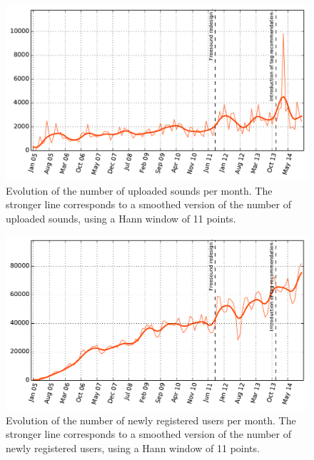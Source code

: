 \begin{figure}
\centerline{\includegraphics[width=1.0\columnwidth]{ch99/pics/Number_of_sounds}}
\caption[Evolution of the number of sounds]{Evolution of the number of uploaded sounds per month. The stronger line corresponds to a smoothed version of the number of uploaded sounds, using a Hann window of 11 points.}
\label{app:fs:new_sounds}
\end{figure}

\begin{figure}
\centerline{\includegraphics[width=1.0\columnwidth]{ch99/pics/Number_of_users}}
\caption[Evolution of the number of newly registered users]{Evolution of the number of newly registered users per month. The stronger line corresponds to a smoothed version of the number of newly registered users, using a Hann window of 11 points.}
\label{app:fs:new_users}
\end{figure}


